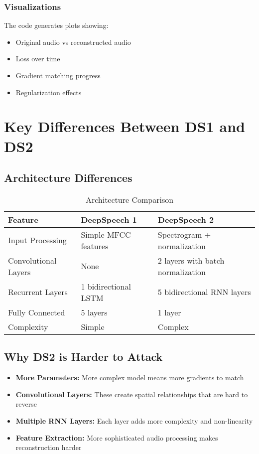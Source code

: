 \documentclass[12pt]{article}
\begin{document}
\subsubsection{Visualizations}
The code generates plots showing:
\begin{itemize}
    \item Original audio vs reconstructed audio
    \item Loss over time
    \item Gradient matching progress
    \item Regularization effects
\end{itemize}

\section{Key Differences Between DS1 and DS2}

\subsection{Architecture Differences}

\begin{table}[h]
\centering
\begin{tabular}{|l|l|l|}
\hline
\textbf{Feature} & \textbf{DeepSpeech 1} & \textbf{DeepSpeech 2} \\
\hline
Input Processing & Simple MFCC features & Spectrogram + normalization \\
\hline
Convolutional Layers & None & 2 layers with batch normalization \\
\hline
Recurrent Layers & 1 bidirectional LSTM & 5 bidirectional RNN layers \\
\hline
Fully Connected & 5 layers & 1 layer \\
\hline
Complexity & Simple & Complex \\
\hline
\end{tabular}
\caption{Architecture Comparison}
\end{table}

\subsection{Why DS2 is Harder to Attack}

\begin{itemize}
    \item \textbf{More Parameters:} More complex model means more gradients to match
    \item \textbf{Convolutional Layers:} These create spatial relationships that are hard to reverse
    \item \textbf{Multiple RNN Layers:} Each layer adds more complexity and non-linearity
    \item \textbf{Feature Extraction:} More sophisticated audio processing makes reconstruction harder
\end{itemize}
\end{document}

